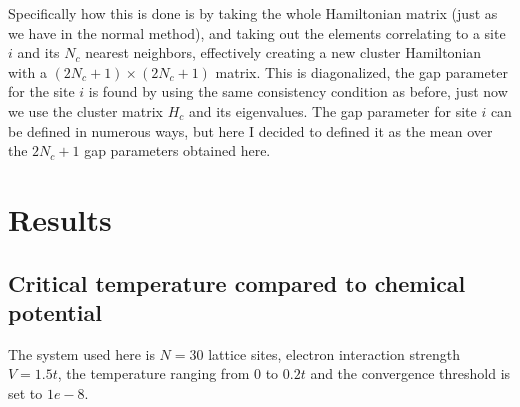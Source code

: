 \documentclass[11pt]{article}
\begin{document}
Specifically how this is done is by taking the whole Hamiltonian matrix (just as we have in the normal method), and taking out the elements correlating to a site $i$ and its $N_c$ nearest neighbors, effectively creating a new cluster Hamiltonian with a $(2N_c + 1)\times(2N_c + 1)$ matrix. This is diagonalized, the gap parameter for the site $i$ is found by using the same consistency condition as before, just now we use the cluster matrix $H_c$ and its eigenvalues. The gap parameter for site $i$ can be defined in numerous ways, but here I decided to defined it as the mean over the $2N_c + 1$ gap parameters obtained here. 

\section{Results}\label{sec:results}


\subsection{Critical temperature compared to chemical potential}
The system used here is $N = 30$ lattice sites, electron interaction strength $V=1.5t$, the temperature ranging from $0$ to $0.2t$ and the convergence threshold is set to $1e-8$. 
\end{document}
